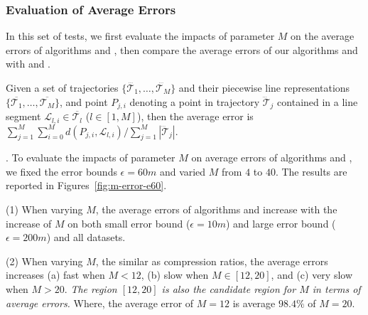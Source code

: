 \subsubsection{Evaluation of Average Errors}
In this set of tests, we first evaluate the impacts of parameter $M$ on the average errors of algorithms \cist and \cista, then compare the average errors of our algorithms \cist and \cista with \dps and \squishe.

Given a set of trajectories $\{\dddot{\mathcal{T}_1}, \ldots, \dddot{\mathcal{T}_M}\}$ and their piecewise line representations $\{\overline{\mathcal{T}_1}, \ldots, \overline{\mathcal{T}_M}\}$, and point $P_{j,i}$ denoting
a point in trajectory $\dddot{\mathcal{T}}_j$ contained in a line segment $\mathcal{L}_{l,i}\in\overline{\mathcal{T}_l}$ ($l\in[1,M]$),
then the average error is $\sum_{j=1}^{M}\sum_{i=0}^{M} d(P_{j,i},
\mathcal{L}_{l,i})/\sum_{j=1}^{M}{|\dddot{\mathcal{T}}_j |}$.



.
To evaluate the impacts of parameter $M$ on average errors of algorithms \cist and \cista, we fixed the error bounds {$\epsilon =60m$} and varied $M$ from $4$ to $40$.
The results are reported in Figures~\ref{fig:m-error-e60}.




\ni(1) When varying $M$, the average errors of algorithms \cist and \cista increase with the increase of $M$ on both small error bound {(\eg $\epsilon = 10m$)} and large error bound (\eg $\epsilon = 200m$) and all datasets.

\ni(2) When varying $M$, the similar as compression ratios,
 the average errors increases (a) fast when $M < 12$, (b) slow when $M \in [12, 20]$, and (c) very slow when $M  > 20$. \emph{The region $[12, 20]$ is also the candidate region for $M$ in terms of average errors.}
Where, the average error of $M=12$ is average {$98.4\%$} of $M=20$.




